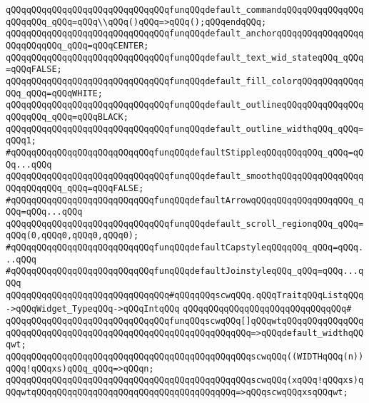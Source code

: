 \verb|qQQqqQQqqQQqqQQqqQQqqQQqqQQqqQQqfunqQQqdefault_commandqQQqqQQqqQQqqQQqqQQqqQQq_qQQq=qQQq\\qQQq()qQQq=>qQQq();qQQqendqQQq;|\newline
\verb|qQQqqQQqqQQqqQQqqQQqqQQqqQQqqQQqfunqQQqdefault_anchorqQQqqQQqqQQqqQQqqQQqqQQqqQQq_qQQq=qQQqCENTER;|\newline
\verb|qQQqqQQqqQQqqQQqqQQqqQQqqQQqqQQqfunqQQqdefault_text_wid_stateqQQq_qQQq=qQQqFALSE;|\newline
\verb|qQQqqQQqqQQqqQQqqQQqqQQqqQQqqQQqfunqQQqdefault_fill_colorqQQqqQQqqQQqqQQq_qQQq=qQQqWHITE;|\newline
\verb|qQQqqQQqqQQqqQQqqQQqqQQqqQQqqQQqfunqQQqdefault_outlineqQQqqQQqqQQqqQQqqQQqqQQq_qQQq=qQQqBLACK;|\newline
\verb|qQQqqQQqqQQqqQQqqQQqqQQqqQQqqQQqfunqQQqdefault_outline_widthqQQq_qQQq=qQQq1;|\newline
\verb|#qQQqqQQqqQQqqQQqqQQqqQQqqQQqfunqQQqdefaultStippleqQQqqQQqqQQq_qQQq=qQQq...qQQq|\newline
\verb|qQQqqQQqqQQqqQQqqQQqqQQqqQQqqQQqfunqQQqdefault_smoothqQQqqQQqqQQqqQQqqQQqqQQqqQQq_qQQq=qQQqFALSE;|\newline
\verb|#qQQqqQQqqQQqqQQqqQQqqQQqqQQqfunqQQqdefaultArrowqQQqqQQqqQQqqQQqqQQq_qQQq=qQQq...qQQq|\newline
\verb|qQQqqQQqqQQqqQQqqQQqqQQqqQQqqQQqfunqQQqdefault_scroll_regionqQQq_qQQq=qQQq(0,qQQq0,qQQq0,qQQq0);|\newline
\verb|#qQQqqQQqqQQqqQQqqQQqqQQqqQQqfunqQQqdefaultCapstyleqQQqqQQq_qQQq=qQQq...qQQq|\newline
\verb|#qQQqqQQqqQQqqQQqqQQqqQQqqQQqfunqQQqdefaultJoinstyleqQQq_qQQq=qQQq...qQQq|\newline
\newline
\verb|qQQqqQQqqQQqqQQqqQQqqQQqqQQqqQQq#qQQqqQQqscwqQQq.qQQqTraitqQQqListqQQq->qQQqWidget_TypeqQQq->qQQqIntqQQq|\newline
\verb|qQQqqQQqqQQqqQQqqQQqqQQqqQQqqQQq#|\newline
\verb|qQQqqQQqqQQqqQQqqQQqqQQqqQQqqQQqfunqQQqscwqQQq[]qQQqwtqQQqqQQqqQQqqQQqqQQqqQQqqQQqqQQqqQQqqQQqqQQqqQQqqQQqqQQqqQQqqQQq=>qQQqdefault_widthqQQqwt;|\newline
\verb|qQQqqQQqqQQqqQQqqQQqqQQqqQQqqQQqqQQqqQQqqQQqqQQqscwqQQq((WIDTHqQQq(n))qQQq!qQQqxs)qQQq_qQQq=>qQQqn;|\newline
\verb|qQQqqQQqqQQqqQQqqQQqqQQqqQQqqQQqqQQqqQQqqQQqqQQqscwqQQq(xqQQq!qQQqxs)qQQqwtqQQqqQQqqQQqqQQqqQQqqQQqqQQqqQQqqQQqqQQq=>qQQqscwqQQqxsqQQqwt;|\newline
